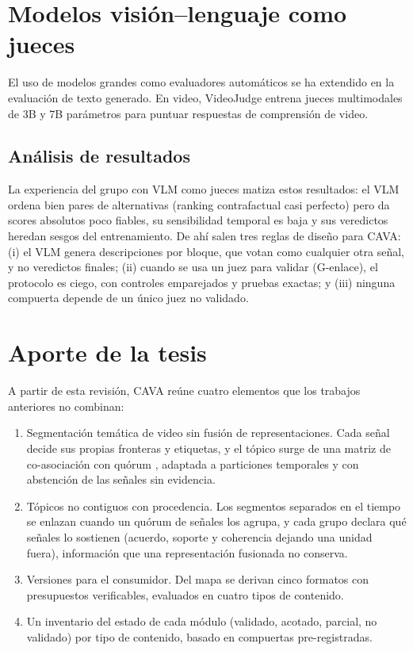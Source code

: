 \section{Modelos visión--lenguaje como jueces}

El uso de modelos grandes como evaluadores automáticos se ha extendido en la evaluación de
texto generado. En video, VideoJudge \cite{videojudge2025} entrena jueces multimodales de 3B y
7B parámetros para puntuar respuestas de comprensión de video.

\subsection{Análisis de resultados}
La experiencia del grupo con VLM como jueces matiza estos resultados: el VLM ordena bien
pares de alternativas (ranking contrafactual casi perfecto) pero da scores absolutos poco
fiables, su sensibilidad temporal es baja y sus veredictos heredan sesgos del entrenamiento.
De ahí salen tres reglas de diseño para CAVA: (i) el VLM genera descripciones por bloque, que
votan como cualquier otra señal, y no veredictos finales; (ii) cuando se usa un juez para
validar (G-enlace), el protocolo es ciego, con controles emparejados y pruebas exactas; y
(iii) ninguna compuerta depende de un único juez no validado.

\section{Aporte de la tesis}

A partir de esta revisión, CAVA reúne cuatro elementos que los trabajos anteriores no
combinan:
\begin{enumerate}
  \item Segmentación temática de video sin fusión de representaciones. Cada señal decide sus
        propias fronteras y etiquetas, y el tópico surge de una matriz de co-asociación con
        quórum \cite{fred2005evidence}, adaptada a particiones temporales y con abstención de
        las señales sin evidencia.
  \item Tópicos no contiguos con procedencia. Los segmentos separados en el tiempo se enlazan
        cuando un quórum de señales los agrupa, y cada grupo declara qué señales lo sostienen
        (acuerdo, soporte y coherencia dejando una unidad fuera), información que una
        representación fusionada no conserva.
  \item Versiones para el consumidor. Del mapa se derivan cinco formatos con presupuestos
        verificables, evaluados en cuatro tipos de contenido.
  \item Un inventario del estado de cada módulo (validado, acotado, parcial, no validado) por
        tipo de contenido, basado en compuertas pre-registradas.
\end{enumerate}
